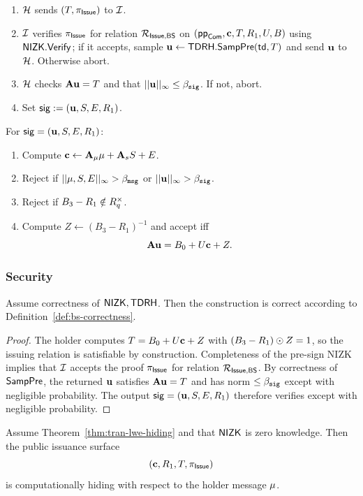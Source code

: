 \begin{description}
\begin{enumerate}
\item \(\mathcal{H}\) sends \((T,\pi_{\mathsf{Issue}})\) to \(\mathcal{I}\).
\item \(\mathcal{I}\) verifies \(\pi_{\mathsf{Issue}}\) for relation \(\mathcal{R}_{\mathsf{Issue,BS}}\) on
\((\mathsf{pp}_{\mathsf{Com}},\mathbf{c},T,R_1,U,B)\) using \(\mathsf{NIZK}.\mathsf{Verify}\); if it accepts, sample
\(\mathbf{u} \gets \mathsf{TDRH}.\mathsf{SampPre}(\mathsf{td},T)\) and send \(\mathbf{u}\) to \(\mathcal{H}\). Otherwise abort.
\item \(\mathcal{H}\) checks \(\mathbf{A} \mathbf{u} = T\) and that \( || \mathbf{u} ||_\infty \leq \beta_{\mathtt{sig}} \). If not, abort.
\item Set \(\mathsf{sig}:=(\mathbf{u},S,E,R_1)\).
\end{enumerate}
\item[$\Verify(\vk,\vecmu,\sig)$:] For \(\mathsf{sig}=(\mathbf{u},S,E,R_1)\):
\begin{enumerate}
\item Compute \(\mathbf{c}\gets \mathbf{A}_\mu\mathbf{\mu} + \mathbf{A}_s S + E\).
\item Reject if \(||\mathbf{\mu},S,E||_\infty > \beta_{\mathtt{msg}}\) or \(||\mathbf{u}||_\infty > \beta_{\mathtt{sig}}\).
\item Reject if \(B_3-R_1\notin R_q^\times\).
\item Compute \(Z\gets (B_3-R_1)^{-1}\) and accept iff
\[
\mathbf{A}\mathbf{u} = B_0 + U\mathbf{c} + Z.
\]
\end{enumerate}
\end{description}

\subsubsection{Security}
\begin{proposition}[Correctness]
Assume correctness of \(\mathsf{NIZK},\mathsf{TDRH}\). Then the construction is correct according to
Definition~\ref{def:bs-correctness}.
\end{proposition}

\begin{proof}
The holder computes \(T=B_0+U\mathbf{c}+Z\) with \((B_3-R_1)\odot Z=1\), so the issuing relation is satisfiable by
construction. Completeness of the pre-sign NIZK implies that \(\mathcal{I}\) accepts the proof \(\pi_{\mathsf{Issue}}\) for relation
\(\mathcal{R}_{\mathsf{Issue,BS}}\). By correctness of \(\mathsf{SampPre}\), the returned \(\mathbf{u}\) satisfies \(\mathbf{A}\mathbf{u}=T\) and has norm
\(\leq \beta_{\mathtt{sig}}\) except with negligible probability. The output \(\mathsf{sig}=(\mathbf{u},S,E,R_1)\) therefore verifies except
with negligible probability.
\end{proof}

\begin{proposition}\label{prop:bs-issuance-hiding}
Assume Theorem~\ref{thm:tran-lwe-hiding} and that \(\mathsf{NIZK}\) is zero knowledge. Then the public issuance
surface
\[
(\mathbf{c},R_1,T,\pi_{\mathsf{Issue}})
\]
is computationally hiding with respect to the holder message \(\mathbf{\mu}\).
\end{proposition}


